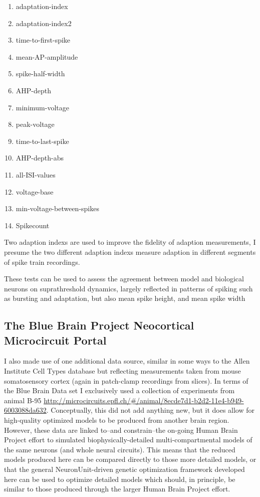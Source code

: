 \begin{enumerate}
\item adaptation-index
\item adaptation-index2
\item time-to-first-spike
\item mean-AP-amplitude
\item spike-half-width
\item AHP-depth
\item minimum-voltage
\item peak-voltage
\item time-to-last-spike
\item AHP-depth-abs
\item all-ISI-values
\item voltage-base
\item min-voltage-between-spikes
\item Spikecount
\end{enumerate}


Two adaption indexs are used to improve the fidelity of adaption measurements, I presume the two different adaption indexs measure adaption in different segments of spike train recordings.


These tests can be used to assess the agreement between model and biological neurons on suprathreshold dynamics, largely reflected in patterns of spiking such as bursting and adaptation, but also mean spike height, and mean spike width

\subsection{The Blue Brain Project Neocortical Microcircuit Portal}
I also made use of one additional data source, similar in some ways to the Allen Institute Cell Types database but reflecting measurements taken from mouse somatosensory cortex (again in patch-clamp recordings from slices). In terms of the Blue Brain Data set I exclusively used a collection of experiments from animal B-95 \url{http://microcircuits.epfl.ch/#/animal/8ecde7d1-b2d2-11e4-b949-6003088da632}.
Conceptually, this did not add anything new, but it does allow for high-quality optimized models to be produced from another brain region.
However, these data are linked to--and constrain--the on-going Human Brain Project effort to simulated biophysically-detailed multi-compartmental models of the same neurons (and whole neural circuits).
This means that the reduced models produced here can be compared directly to those more detailed models, or that the general NeuronUnit-driven genetic optimization framework developed here can be used to optimize detailed models which should, in principle, be similar to those produced through the larger Human Brain Project effort.

